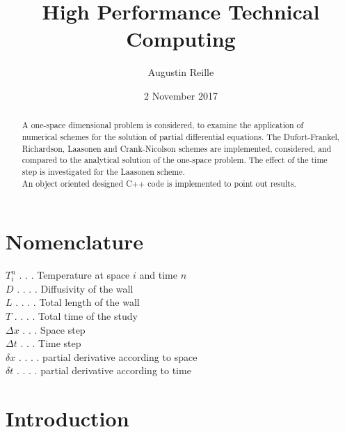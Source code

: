 \documentclass{article}
\title{High Performance Technical Computing}
\author{Augustin Reille}
\date{2 November 2017}
\begin{document}
        \maketitle
    
        \begin{abstract}
            A one-space dimensional problem is considered, to examine the application
            of numerical schemes for the solution of partial differential equations.
            The Dufort-Frankel, Richardson, Laasonen and Crank-Nicolson schemes are implemented,
            considered, and compared to the analytical solution of the one-space problem.
            The effect of the time step is investigated for the Laasonen scheme.
            \\ An object oriented designed C++ code is implemented to point out results.
        \end{abstract}
    
        \newpage
        \tableofcontents
    
        \newpage
        \listoffigures
    
        \listoftables
    
        \lstlistoflistings
    
        \section*{Nomenclature}
            $T_i^n$ . . . Temperature at space $i$ and time $n$\\
            $D$ . . . . Diffusivity of the wall\\
            $L$ . . . . Total length of the wall\\
            $T$ . . . . Total time of the study\\
            $\Delta x$ . . . Space step\\
            $\Delta t$ . . . Time step\\
            $\delta x$ . . . . partial derivative according to space\\
            $\delta t$ . . . . partial derivative according to time\\
        \newpage
        \section{Introduction}
    
\end{document}
